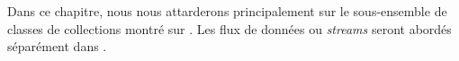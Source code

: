 \documentclass[a4paper,10pt,twoside]{book}
\begin{document}



Dans ce chapitre, nous nous attarderons principalement sur le sous-ensemble
de classes de collections montré sur 
.
Les flux de données ou \emph{streams} seront abordés séparément dans 
.


\end{document}
